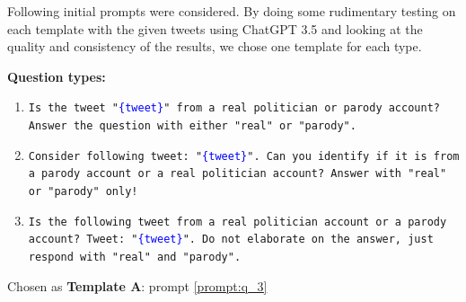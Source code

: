 \documentclass[12pt,a4paper]{article}
\begin{document}
Following initial prompts were considered. By doing some rudimentary testing on each template with the given tweets using ChatGPT 3.5 and looking at the quality and consistency of the results, we chose one template for each type.\vspace{0.5em}

\noindent
\begin{minipage}[c]{0.53\textwidth}
\textbf{Question types:}\vspace{-0.3em}
\scriptsize
\begin{enumerate}[itemsep=1pt, left=0pt]
    \item \texttt{Is the tweet "\textcolor{blue}{\{tweet\}}" from a real politician or parody account? Answer the question with either "real" or "parody".}

    
    \item \texttt{Consider following tweet: "\textcolor{blue}{\{tweet\}}". Can you identify if it is from a parody account or a real politician account? Answer with "real" or "parody" only!}


    \item \texttt{Is the following tweet from a real politician account or a parody account? Tweet: "\textcolor{blue}{\{tweet\}}". Do not elaborate on the answer, just respond with "real" and "parody".} \label{prompt:q_3}
    
\end{enumerate}
\vspace{-1em}
\normalsize

Chosen as \textbf{Template A}: prompt \ref{prompt:q_3} 
\end{minipage}\hfill
\end{document}
